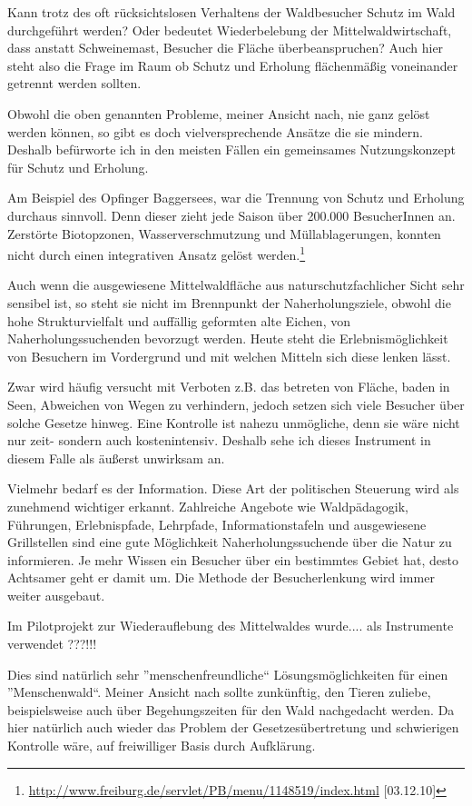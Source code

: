 \documentclass[12pt]{article}
\newcommand{\citefooturldate}[2]{\footnote{\url{#1} [#2]}}
\begin{document}
Kann trotz des oft rücksichtslosen Verhaltens der Waldbesucher Schutz im Wald durchgeführt werden? Oder 
bedeutet Wiederbelebung der Mittelwaldwirtschaft, dass anstatt Schweinemast, Besucher die Fläche überbeanspruchen?
Auch hier steht also die Frage im Raum ob Schutz und Erholung flächenmäßig voneinander getrennt werden 
sollten. 

Obwohl die oben genannten Probleme, meiner Ansicht nach, nie ganz gelöst werden können, so gibt es
doch vielversprechende Ansätze die sie mindern. Deshalb befürworte ich in den meisten Fällen
ein gemeinsames Nutzungskonzept für Schutz und Erholung.

Am Beispiel des Opfinger Baggersees, war die Trennung von Schutz und Erholung durchaus sinnvoll. Denn
dieser zieht jede Saison über 200.000 BesucherInnen an. Zerstörte Biotopzonen, Wasserverschmutzung und
Müllablagerungen, konnten nicht durch einen integrativen Ansatz gelöst werden.\citefooturldate{http://www.freiburg.de/servlet/PB/menu/1148519/index.html}{03.12.10}

Auch wenn die ausgewiesene Mittelwaldfläche aus naturschutzfachlicher Sicht sehr sensibel ist, so steht sie nicht im 
Brennpunkt der Naherholungsziele, obwohl die hohe Strukturvielfalt und auffällig geformten alte Eichen,
von Naherholungssuchenden bevorzugt werden. Heute steht die Erlebnismöglichkeit von Besuchern im 
Vordergrund und mit welchen Mitteln sich diese lenken lässt.

Zwar wird häufig versucht mit Verboten z.B. das betreten von Fläche, baden in Seen, Abweichen von Wegen 
zu verhindern, jedoch setzen sich viele Besucher über solche Gesetze hinweg. Eine Kontrolle ist nahezu
unmögliche, denn sie wäre nicht nur zeit- sondern auch kostenintensiv. Deshalb sehe ich dieses Instrument
in diesem Falle als äußerst unwirksam an.

Vielmehr bedarf es der Information. Diese Art der politischen Steuerung wird als zunehmend wichtiger
erkannt. Zahlreiche Angebote wie Waldpädagogik, Führungen, Erlebnispfade, Lehrpfade, Informationstafeln
und ausgewiesene Grillstellen sind eine gute Möglichkeit Naherholungssuchende über die Natur zu
informieren. Je mehr Wissen ein Besucher über ein bestimmtes Gebiet hat, desto Achtsamer geht er damit um.
Die Methode der Besucherlenkung wird immer weiter ausgebaut.

Im Pilotprojekt zur Wiederauflebung des Mittelwaldes wurde.... als Instrumente verwendet ???!!!

Dies sind natürlich sehr ''menschenfreundliche`` Lösungsmöglichkeiten für einen ''Menschenwald``.
Meiner Ansicht nach sollte zunkünftig, den Tieren zuliebe, beispielsweise auch über Begehungszeiten 
für den Wald nachgedacht werden. Da hier natürlich auch wieder das Problem der Gesetzesübertretung und
schwierigen Kontrolle wäre, auf freiwilliger Basis durch Aufklärung.
 
\end{document}
